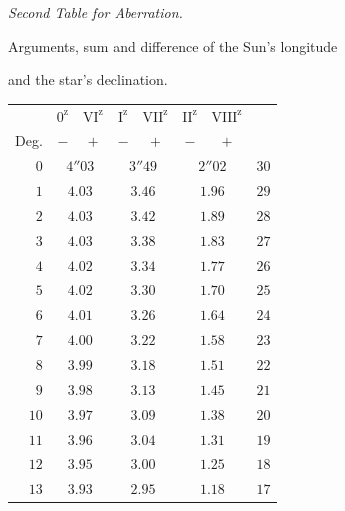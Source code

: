 \begin{center}
\textit{Second Table for Aberration.}\par\medskip
Arguments, sum and difference of the Sun’s longitude\par
and the star’s declination.\par\medskip
\begingroup\small\setlength{\tabcolsep}{8pt}
\begin{tabular}{r||cc|cc|cc||r}
&$0^{\mathrm z}$&$\mathrm{VI}^{\mathrm z}$&$\mathrm I^{\mathrm z}$&$\mathrm{VII}^{\mathrm z}$&$\mathrm{II}^{\mathrm z}$&$\mathrm{VIII}^{\mathrm z}$&\\
Deg.&$-$&$+$&$-$&$+$&$-$&$+$&\\\hline
$0$&\multicolumn{2}{c|}{$4''03$}&\multicolumn{2}{c|}{$3''49$}&\multicolumn{2}{c||}{$2''02$}&$30$\\
$1$&\multicolumn{2}{c|}{$4.03$}&\multicolumn{2}{c|}{$3.46$}&\multicolumn{2}{c||}{$1.96$}&$29$\\
$2$&\multicolumn{2}{c|}{$4.03$}&\multicolumn{2}{c|}{$3.42$}&\multicolumn{2}{c||}{$1.89$}&$28$\\
$3$&\multicolumn{2}{c|}{$4.03$}&\multicolumn{2}{c|}{$3.38$}&\multicolumn{2}{c||}{$1.83$}&$27$\\
$4$&\multicolumn{2}{c|}{$4.02$}&\multicolumn{2}{c|}{$3.34$}&\multicolumn{2}{c||}{$1.77$}&$26$\\
$5$&\multicolumn{2}{c|}{$4.02$}&\multicolumn{2}{c|}{$3.30$}&\multicolumn{2}{c||}{$1.70$}&$25$\\[3pt]
$6$&\multicolumn{2}{c|}{$4.01$}&\multicolumn{2}{c|}{$3.26$}&\multicolumn{2}{c||}{$1.64$}&$24$\\
$7$&\multicolumn{2}{c|}{$4.00$}&\multicolumn{2}{c|}{$3.22$}&\multicolumn{2}{c||}{$1.58$}&$23$\\
$8$&\multicolumn{2}{c|}{$3.99$}&\multicolumn{2}{c|}{$3.18$}&\multicolumn{2}{c||}{$1.51$}&$22$\\
$9$&\multicolumn{2}{c|}{$3.98$}&\multicolumn{2}{c|}{$3.13$}&\multicolumn{2}{c||}{$1.45$}&$21$\\
$10$&\multicolumn{2}{c|}{$3.97$}&\multicolumn{2}{c|}{$3.09$}&\multicolumn{2}{c||}{$1.38$}&$20$\\[3pt]
$11$&\multicolumn{2}{c|}{$3.96$}&\multicolumn{2}{c|}{$3.04$}&\multicolumn{2}{c||}{$1.31$}&$19$\\
$12$&\multicolumn{2}{c|}{$3.95$}&\multicolumn{2}{c|}{$3.00$}&\multicolumn{2}{c||}{$1.25$}&$18$\\
$13$&\multicolumn{2}{c|}{$3.93$}&\multicolumn{2}{c|}{$2.95$}&\multicolumn{2}{c||}{$1.18$}&$17$\\

\end{tabular}
\end{center}
